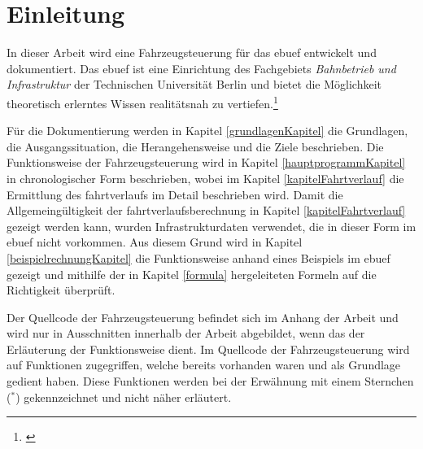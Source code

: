 \section{Einleitung}
\acresetall
In dieser Arbeit wird eine Fahrzeugsteuerung für das \ac{ebuef} entwickelt und dokumentiert. Das \ac{ebuef} ist eine Einrichtung des Fachgebiets \textit{Bahnbetrieb und Infrastruktur} der Technischen Universität Berlin und bietet die Möglichkeit theoretisch erlerntes Wissen realitätsnah zu vertiefen.\footnote{\cite{ebuef}}

Für die Dokumentierung werden in Kapitel \ref{grundlagenKapitel} die Grundlagen, die Ausgangssituation, die Herangehensweise und die Ziele beschrieben. Die Funktionsweise der Fahrzeugsteuerung wird in Kapitel \ref{hauptprogrammKapitel} in chronologischer Form beschrieben, wobei im Kapitel \ref{kapitelFahrtverlauf} die Ermittlung des \Gls{fahrtverlauf}s im Detail beschrieben wird. Damit die Allgemeingültigkeit der \Gls{fahrtverlauf}sberechnung in Kapitel \ref{kapitelFahrtverlauf} gezeigt werden kann, wurden Infrastrukturdaten verwendet, die in dieser Form im \ac{ebuef} nicht vorkommen. Aus diesem Grund wird in Kapitel \ref{beispielrechnungKapitel} die Funktionsweise anhand eines Beispiels im \ac{ebuef} gezeigt und mithilfe der in Kapitel \ref{formula} hergeleiteten Formeln auf die Richtigkeit überprüft.

Der Quellcode der Fahrzeugsteuerung befindet sich im Anhang der Arbeit und wird nur in Ausschnitten innerhalb der Arbeit abgebildet, wenn das der Erläuterung der Funktionsweise dient. Im Quellcode der Fahrzeugsteuerung wird auf Funktionen zugegriffen, welche bereits vorhanden waren und als Grundlage gedient haben. Diese Funktionen werden bei der Erwähnung mit einem Sternchen ($^\ast$) gekennzeichnet und nicht näher erläutert.